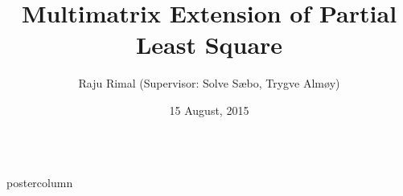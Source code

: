 \documentclass[9pt, final]{beamer}\usepackage[]{graphicx}\usepackage[]{color}
\title{Multimatrix Extension of Partial Least Square}
\author{\small Raju Rimal (Supervisor: Solve S{\ae}bo, Trygve Alm{\o}y)}
\institute[Norwegian University of Life Sciences (NMBU)]{\footnotesize Norwegian University of Life Sciences (NMBU), {\AA}s, Norway}
\date[15 August, 2015]{15 August, 2015}
\newlength{\topcolumn}
\begin{document}
\begin{frame}[fragile]




\begin{columns}

\begin{column}{.49\textwidth}
      \begin{beamercolorbox}[center, wd=\textwidth]{postercolumn}
        \begin{minipage}[T]{.98\textwidth}  %
          \parbox[t][\topcolumn]{\textwidth}{ %
            
}
\end{minipage}
\end{beamercolorbox}
\end{column}
\end{columns}
\end{frame}
\end{document}
